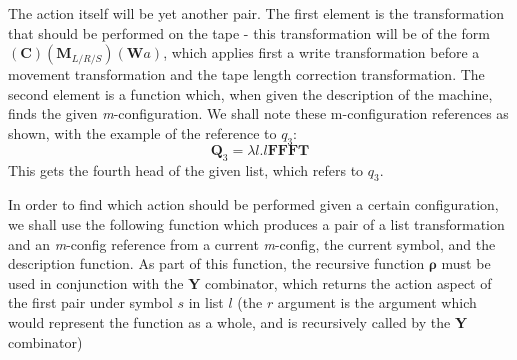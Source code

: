 \documentclass[Master.tex]{subfiles}
\begin{document}
The action itself will be yet another pair. The first element is the transformation that should be performed on the tape - this transformation will be of the form $(\bm{C})(\bm{M}_{L/R/S})(\bm{W}a)$, which applies first a write transformation before a movement transformation and the tape length correction transformation. The second element is a function which, when given the description of the machine, finds the given \textit{m}-configuration. We shall note these m-configuration references as shown, with the example of the reference to $q_3$:
\begin{equation*}
\bm{Q}_3 = \lambda l.l\bm{\textbf{FFFT}}
\end{equation*}
This gets the fourth head of the given list, which refers to $q_3$.



In order to find which action should be performed given a certain configuration, we shall use the following function which produces a pair of a list transformation and an \textit{m}-config reference from a current \textit{m}-config, the current symbol, and the description function. As part of this function, the recursive function $\bm{\rho}$ must be used in conjunction with the \textbf{Y} combinator, which returns the action aspect of the first pair under symbol $s$ in list $l$ (the $r$ argument is the argument which would represent the function as a whole, and is recursively called by the \textbf{Y} combinator)
\end{document}
